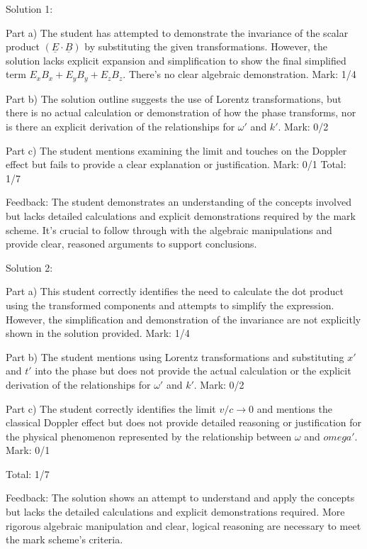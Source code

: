 \documentclass[a4paper,11pt]{article}
\begin{document}
Solution 1:

Part a) The student has attempted to demonstrate the invariance of the scalar product \((\underline{E} \cdot \underline{B})\) by substituting the given transformations. However, the solution lacks explicit expansion and simplification to show the final simplified term \(E_x B_x + E_y B_y + E_z B_z \). There's no clear algebraic demonstration. Mark: 1/4

Part b) The solution outline suggests the use of Lorentz transformations, but there is no actual calculation or demonstration of how the phase transforms, nor is there an explicit derivation of the relationships for \(\omega'\) and \(k'\). Mark: 0/2

Part c) The student mentions examining the limit and touches on the Doppler effect but fails to provide a clear explanation or justification. Mark: 0/1
Total: 1/7

Feedback: The student demonstrates an understanding of the concepts involved but lacks detailed calculations and explicit demonstrations required by the mark scheme. It's crucial to follow through with the algebraic manipulations and provide clear, reasoned arguments to support conclusions.

Solution 2:

Part a) This student correctly identifies the need to calculate the dot product using the transformed components and attempts to simplify the expression. However, the simplification and demonstration of the invariance are not explicitly shown in the solution provided. Mark: 1/4

Part b) The student mentions using Lorentz transformations and substituting \(x'\) and \(t'\) into the phase but does not provide the actual calculation or the explicit derivation of the relationships for \(\omega'\) and \(k'\). Mark: 0/2

Part c) The student correctly identifies the limit \( v/c \rightarrow 0\) and mentions the classical Doppler effect but does not provide detailed reasoning or justification for the physical phenomenon represented by the relationship between \(\omega\) and \(omega'\). Mark: 0/1

Total: 1/7

Feedback: The solution shows an attempt to understand and apply the concepts but lacks the detailed calculations and explicit demonstrations required. More rigorous algebraic manipulation and clear, logical reasoning are necessary to meet the mark scheme's criteria.
\end{document}
